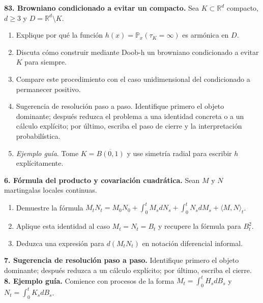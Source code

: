 \documentclass[11pt, letterpaper]{article}
\begin{document}
\begin{ejercicio}
    \textbf{83. Browniano condicionado a evitar un compacto.} Sea $K \subset \mathbb{R}^d$ compacto, $d \ge 3$ y $D = \mathbb{R}^d \setminus K$.
    \begin{enumerate}
        \item Explique por qué la función $h(x) = \mathbb{P}_x(\tau_K = \infty)$ es armónica en $D$.
        \item Discuta cómo construir mediante Doob-h un browniano condicionado a evitar $K$ para siempre.
        \item Compare este procedimiento con el caso unidimensional del condicionado a permanecer positivo.
        \item Sugerencia de resolución paso a paso. Identifique primero el objeto dominante; después reduzca el problema a una identidad concreta o a un cálculo explícito; por último, escriba el paso de cierre y la interpretación probabilística.
        \item \textit{Ejemplo guía}. Tome $K = \overline{B(0, 1)}$ y use simetría radial para escribir $h$ explícitamente.
    \end{enumerate}

    \vspace{2mm}
    \textbf{6. Fórmula del producto y covariación cuadrática.} Sean $M$ y $N$ martingalas locales continuas.
    \begin{enumerate}[label=(\alph*)]
        \item Demuestre la fórmula $M_t N_t = M_0 N_0 + \int_0^t M_s dN_s + \int_0^t N_s dM_s + \langle M, N \rangle_t$.
        \item Aplique esta identidad al caso $M_t = N_t = B_t$ y recupere la fórmula para $B_t^2$.
        \item Deduzca una expresión para $d(M_t N_t)$ en notación diferencial informal.
    \end{enumerate}
    \textbf{7. Sugerencia de resolución paso a paso.} Identifique primero el objeto dominante; después reduzca a un cálculo explícito; por último, escriba el cierre. \\
    \textbf{8. Ejemplo guía.} Comience con procesos de la forma $M_t = \int_0^t H_s dB_s$ y $N_t = \int_0^t K_s dB_s$.
\end{ejercicio}

\vspace{5mm}
\end{document}
